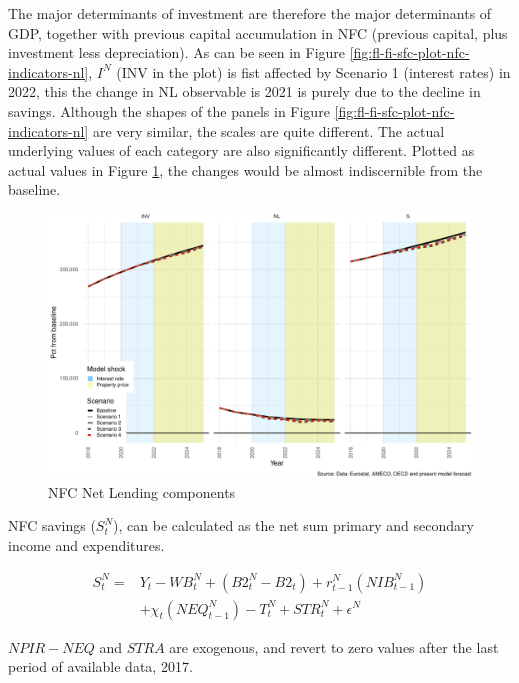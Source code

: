 \documentclass[
]{book}
\begin{document}
The major determinants of investment are therefore the major determinants of GDP, together with previous capital accumulation in NFC (previous capital, plus investment less depreciation). As can be seen in Figure \ref{fig:fl-fi-sfc-plot-nfc-indicators-nl}, \(I^N\) (INV in the plot) is fist affected by Scenario 1 (interest rates) in 2022, this the change in NL observable is 2021 is purely due to the decline in savings. Although the shapes of the panels in Figure \ref{fig:fl-fi-sfc-plot-nfc-indicators-nl} are very similar, the scales are quite different. The actual underlying values of each category are also significantly different. Plotted as actual values in Figure \ref{fig:fl-fi-sfc-plot-nfc-indicators-nl-actuals}, the changes would be almost indiscernible from the baseline.

\begin{figure}
\centering
\includegraphics{figures/fl-fi-sfc-plot-nfc-indicators-nl-actuals-1.pdf}
\caption{\label{fig:fl-fi-sfc-plot-nfc-indicators-nl-actuals}NFC Net Lending components}
\end{figure}

NFC savings (\(S^N_t\)), can be calculated as the net sum primary and secondary income and expenditures.

\begin{equation}
\begin{split}
S^N_t = & Y_t - WB^N_t + (B2^N_{t} - B2_{t}) + r^N_{t-1}(NIB^N_{t-1})\\
        & + \chi _t (NEQ^N_{t-1}) - T^N_t + STR^N_t + \epsilon ^N
\end{split}
\end{equation}

\(NPIR-NEQ\) and \(STRA\) are exogenous, and revert to zero values after the last period of available data, 2017.
\end{document}

